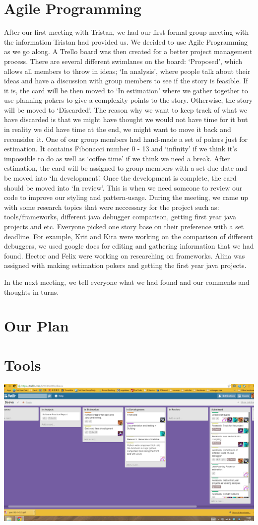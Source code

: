 \documentclass[11pt]{article}
\begin{document}
\section{Agile Programming}
After our first meeting with Tristan, we had our first formal group meeting with the information Tristan had provided us. We decided to use Agile Programming as we go along. A Trello board was then created for a better project management process. There are several different swimlanes on the board: ‘Proposed’, which allows all members to throw in ideas; ‘In analysis’, where people talk about their ideas and have a discussion with group members to see if the story is feasible. If it is, the card will be then moved to ‘In estimation’ where we gather together to use planning pokers to give a complexity points to the story. Otherwise, the story will be moved to ‘Discarded’. The reason why we want to keep track of what we have discarded is that we might have thought we would not have time for it but in reality we did have time at the end, we might want to move it back and reconsider it. One of our group members had hand-made a set of pokers just for estimation. It contains Fibonacci number 0 - 13 and ‘infinity’ if we think it’s impossible to do as well as ‘coffee time’ if we think we need a break. After estimation, the card will be assigned to group members with a set due date and be moved into ‘In development’. Once the development is complete, the card should be moved into ‘In review’. This is when we need someone to review our code to improve our styling and pattern-usage. During the meeting, we came up with some research topics that were neccessary for the project such as: tools/frameworks, different java debugger comparison, getting first year java projects and etc. Everyone picked one story base on their preference with a set deadline. For example, Krit and Kira were working on the comparison of different debuggers, we used google docs for editing and gathering information that we had found. Hector and Felix were working on researching on frameworks. Alina was assigned with making estimation pokers and getting the first year java projects. 

In the next meeting, we tell everyone what we had found and our comments and thoughts in turns.

\section{Our Plan}

\section{Tools}


\includegraphics[width=\textwidth]{TrelloBoard.png}
\end{document}
